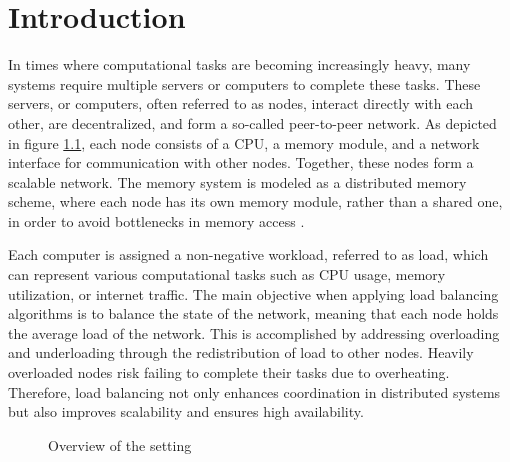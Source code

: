 \chapter{Introduction}\label{chap:introduction}
In times where computational tasks are becoming increasingly heavy, many systems require multiple servers or computers to complete these tasks. These servers, or computers, often referred to as nodes, interact directly with each other, are decentralized, and form a so-called peer-to-peer network. As depicted in figure \ref{fig:setting}, each node consists of a CPU, a memory module, and a network interface for communication with other nodes. Together, these nodes form a scalable network. The memory system is modeled as a distributed memory scheme, where each node has its own memory module, rather than a shared one, in order to avoid bottlenecks in memory access \cite{ChengzhongFrancis}.

Each computer is assigned a non-negative workload, referred to as load, which can represent various computational tasks such as CPU usage, memory utilization, or internet traffic. The main objective when applying load balancing algorithms is to balance the state of the network, meaning that each node holds the average load of the network. This is accomplished by addressing overloading and underloading through the redistribution of load to other nodes. Heavily overloaded nodes risk failing to complete their tasks due to overheating. Therefore, load balancing not only enhances coordination in distributed systems but also improves scalability and ensures high availability.

\begin{figure}[]
    \centering
    \caption{Overview of the setting}
    \label{fig:setting}
\end{figure}

